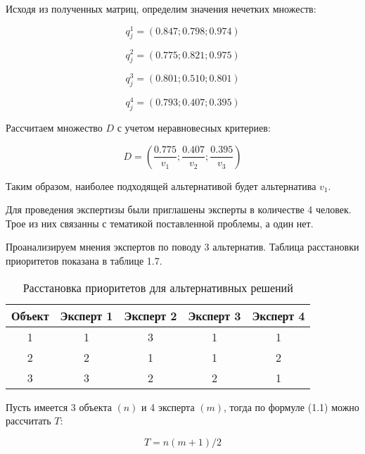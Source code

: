 Исходя из полученных матриц, определим значения нечетких множеств:

\begin{equation}
    q^1_j=(0.847;0.798;0.974) 
\end{equation}

\begin{equation}
    q^2_j=(0.775;0.821;0.975)
\end{equation}

\begin{equation}
    q^3_j=(0.801;0.510;0.801)
\end{equation}

\begin{equation}
    q^4_j=(0.793;0.407;0.395)
\end{equation}

Рассчитаем множество $D$ с учетом неравновесных критериев:

\begin{equation}
    D=(\frac{0.775}{v_1};\frac{0.407}{v_2};\frac{0.395}{v_3})
\end{equation}

Таким образом, наиболее подходящей альтернативой будет альтернатива $v_1$.

Для проведения экспертизы были приглашены эксперты в количестве 4 человек. Трое из них связанны с тематикой поставленной проблемы, а один нет.

Проанализируем мнения экспертов по поводу 3 альтернатив. Таблица расстановки приоритетов показана в таблице 1.7. 

\begin{table}[H]
    \centering
    \caption{Расстановка приоритетов для альтернативных решений}\label{experts_priority}
    \begin{tabular}{|c|c|c|c|c|}
    \hline Объект & Эксперт 1 & Эксперт 2 & Эксперт 3 & Эксперт 4 \\
    \hline 1 & 1 & 3 & 1 & 1  \\
    \hline 2 & 2 & 1 & 1 &  2 \\
    \hline 3 & 3 & 2 & 2 & 1 \\
    \hline
    \end{tabular}
\end{table}

Пусть имеется 3 объекта $(n)$ и 4 эксперта $(m)$, тогда по формуле (1.1) можно рассчитать $T$:

\begin{equation}
    T=n(m+1)/2
\end{equation}

